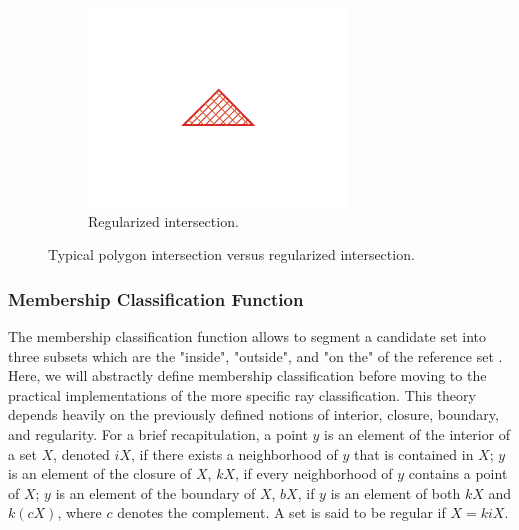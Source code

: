 \documentclass[a4paper,11pt,oneside]{article}
\begin{document}
\begin{figure}[ht]
\begin{subfigure}[b]{0.3\textwidth}
     \end{subfigure}
     \hfill
     \begin{subfigure}[b]{0.3\textwidth}
         \centering
         \includegraphics[width=\textwidth]{section3/3.2/regularization-regular.png}
         \caption{Regularized intersection.}
         \label{sec3.2:regular-intersection}
     \end{subfigure}
        \caption{Typical polygon intersection versus regularized intersection.}
        \label{sec3.2:regularity}
\end{figure}
   
\subsubsection{Membership Classification Function}
The membership classification function allows to segment a candidate set into three subsets which are the "inside", "outside", and "on the" of the reference set \cite{tilove1977a}. Here, we will abstractly define membership classification before moving to the practical implementations of the more specific ray classification.
This theory depends heavily on the previously defined notions of interior, closure, boundary, and regularity. For a brief recapitulation, a point $y$ is an element of the interior of a set $X$, denoted $iX$, if there exists a neighborhood of $y$ that is contained in $X$; $y$ is an element of the closure of $X$, $kX$, if every neighborhood of $y$ contains a point of $X$; $y$ is an element of the boundary of $X$, $bX$, if $y$ is an element of both $kX$ and $k(cX)$, where $c$ denotes the complement. A set is said to be regular if $X = kiX$.
\end{document}
